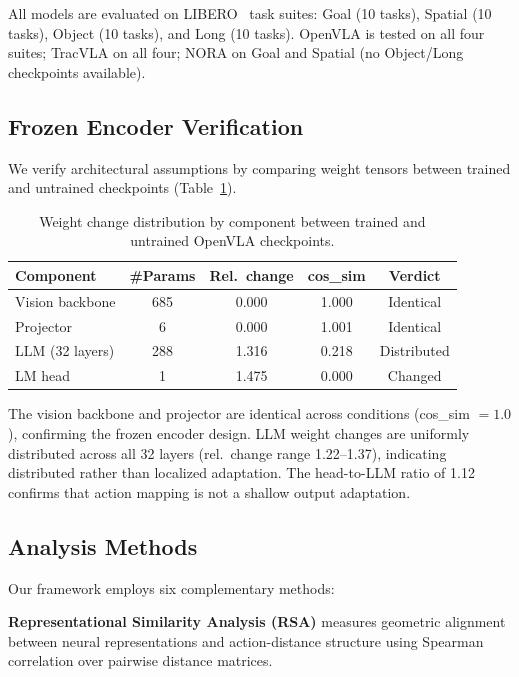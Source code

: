 \documentclass[10pt,twocolumn]{article}
\begin{document}
All models are evaluated on LIBERO~\citep{liu2024libero} task suites: Goal (10 tasks), Spatial (10 tasks), Object (10 tasks), and Long (10 tasks).
OpenVLA is tested on all four suites; TracVLA on all four; NORA on Goal and Spatial (no Object/Long checkpoints available).

\subsection{Frozen Encoder Verification}
\label{sec:weight_verification}

We verify architectural assumptions by comparing weight tensors between trained and untrained checkpoints (Table~\ref{tab:weight_change}).

\begin{table}[t]
\centering
\caption{Weight change distribution by component between trained and untrained OpenVLA checkpoints.}
\label{tab:weight_change}
\small
\begin{tabular}{lcccc}
\toprule
Component & \#Params & Rel.~change & cos\_sim & Verdict \\
\midrule
Vision backbone & 685 & 0.000 & 1.000 & Identical \\
Projector & 6 & 0.000 & 1.001 & Identical \\
LLM (32 layers) & 288 & 1.316 & 0.218 & Distributed \\
LM head & 1 & 1.475 & 0.000 & Changed \\
\bottomrule
\end{tabular}
\end{table}

The vision backbone and projector are identical across conditions (cos\_sim $= 1.0$), confirming the frozen encoder design.
LLM weight changes are uniformly distributed across all 32 layers (rel.\ change range 1.22--1.37), indicating distributed rather than localized adaptation.
The head-to-LLM ratio of 1.12 confirms that action mapping is not a shallow output adaptation.

\subsection{Analysis Methods}

Our framework employs six complementary methods:

\textbf{Representational Similarity Analysis (RSA)} measures geometric alignment between neural representations and action-distance structure using Spearman correlation over pairwise distance matrices.
\end{document}
